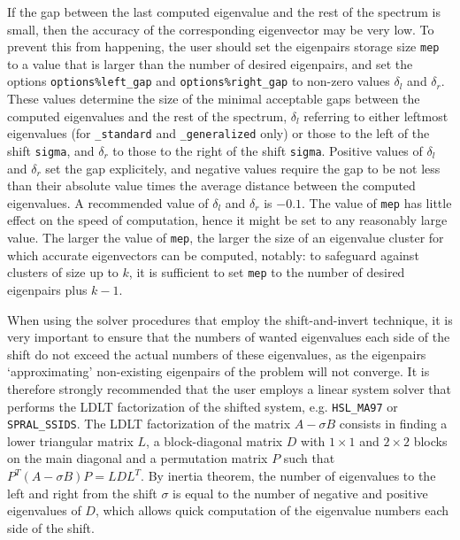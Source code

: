 If the gap %
between the last computed eigenvalue 
and the rest of the spectrum is small,
then the accuracy of the corresponding eigenvector may be very low.
To prevent this from happening,
the user should set the eigenpairs storage size {\tt mep}
to a value that is larger than the number of desired eigenpairs,
and set the options 
{\tt options\%left\_gap}
and
{\tt options\%right\_gap}
to non-zero values $\delta_l$ and $\delta_r$.
These values
determine the size of the minimal acceptable gaps
between the computed eigenvalues and the rest of the spectrum,
$\delta_l$ referring to either leftmost eigenvalues
(for {\tt \solver\_standard} and {\tt \solver\_generalized} only)
or those to the left of the shift {\tt sigma},
and $\delta_r$
to those to the right of the shift {\tt sigma}.
Positive values of $\delta_l$ and $\delta_r$
set the gap explicitely,
and negative values
require the gap to be not less than their absolute value times
the average distance between the computed eigenvalues.
A recommended value of $\delta_l$ and $\delta_r$ is $-0.1$.
The value of {\tt mep} %
has little effect on
the speed of computation,
hence it might be set to any reasonably large value.
The larger the value of {\tt mep}, 
the larger the size of an eigenvalue cluster
for which accurate eigenvectors can be computed, notably:
to safeguard against clusters of size up to $k$,
it is sufficient to set {\tt mep} to the number of desired eigenpairs
plus $k - 1$.

When using the solver procedures that employ the shift-and-invert technique,
it is very important to ensure that the numbers of wanted eigenvalues
each side of the shift do not exceed the actual numbers of these eigenvalues,
as the eigenpairs `approximating' non-existing eigenpairs of the problem
will not converge.
It is therefore strongly recommended that the user employs 
a linear system solver that performs
the LDLT
factorization of %
the shifted system,
e.g. {\tt HSL\_MA97} or {\tt SPRAL\_SSIDS}.
The LDLT factorization of the matrix
$A - \sigma B$ consists in finding a lower triangular
matrix $L$, a block-diagonal matrix $D$
with $1\times 1$ and $2\times 2$ blocks on the main diagonal
and a permutation matrix $P$
such that $P^T(A - \sigma B)P = L D L^T$.
By inertia theorem,
the number of eigenvalues to the left and right from 
the shift $\sigma$
is equal to the number of negative and positive eigenvalues of $D$,
which allows quick computation of the eigenvalue numbers
each side of the shift. %

